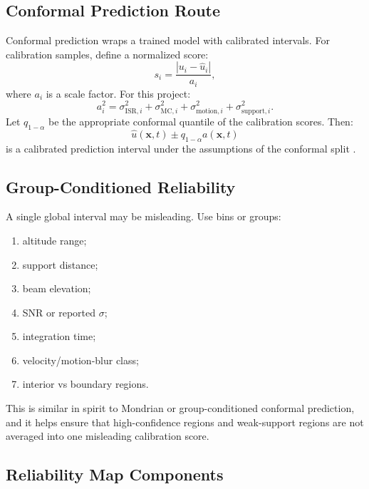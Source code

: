 \documentclass[11pt]{article}
\begin{document}
\subsection{Conformal Prediction Route}

Conformal prediction wraps a trained model with calibrated intervals. For calibration samples,
define a normalized score:
\begin{equation}
  s_i
  =
  \frac{
    |u_i-\hat{u}_i|
  }{
    a_i
  },
\end{equation}
where $a_i$ is a scale factor. For this project:
\begin{equation}
  a_i^2
  =
  \sigma_{\mathrm{ISR},i}^2
  +
  \sigma_{\mathrm{MC},i}^2
  +
  \sigma_{\mathrm{motion},i}^2
  +
  \sigma_{\mathrm{support},i}^2.
\end{equation}
Let $q_{1-\alpha}$ be the appropriate conformal quantile of the calibration scores. Then:
\begin{equation}
  \hat{u}(\mathbf{x},t)
  \pm
  q_{1-\alpha}a(\mathbf{x},t)
\end{equation}
is a calibrated prediction interval under the assumptions of the conformal split
\cite{AngelopoulosBates2021,Romano2019CQR}.

\subsection{Group-Conditioned Reliability}

A single global interval may be misleading. Use bins or groups:
\begin{enumerate}[leftmargin=*]
  \item altitude range;
  \item support distance;
  \item beam elevation;
  \item SNR or reported $\sigma$;
  \item integration time;
  \item velocity/motion-blur class;
  \item interior vs boundary regions.
\end{enumerate}
This is similar in spirit to Mondrian or group-conditioned conformal prediction, and it helps ensure
that high-confidence regions and weak-support regions are not averaged into one misleading
calibration score.

\subsection{Reliability Map Components}
\end{document}
